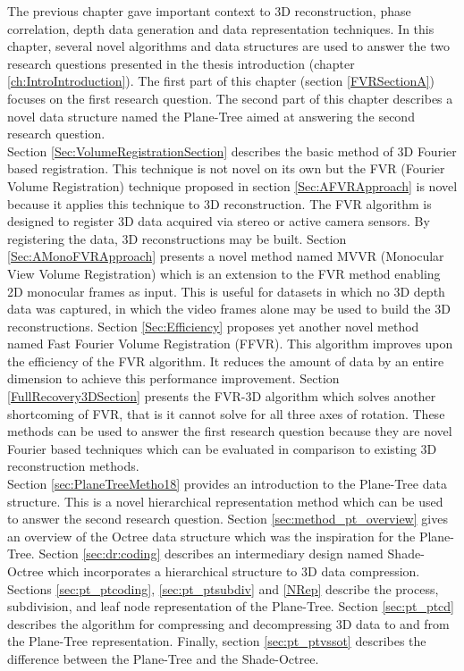 
The previous chapter gave important context to 3D reconstruction, phase correlation, depth data generation and data representation techniques. In this chapter, several novel algorithms and data structures are used to answer the two research questions presented in the thesis introduction (chapter \ref{ch:IntroIntroduction}). The first part of this chapter (section \ref{FVRSectionA}) focuses on the first research question. The second part of this chapter describes a novel data structure named the Plane-Tree aimed at answering the second research question. \\

Section \ref{Sec:VolumeRegistrationSection} describes the basic method of 3D Fourier based registration. This technique is not novel on its own but the FVR (Fourier Volume Registration) technique proposed in section \ref{Sec:AFVRApproach} is novel because it applies this technique to 3D reconstruction. The FVR algorithm is designed to register 3D data acquired via stereo or active camera sensors. By registering the data, 3D reconstructions may be built. Section \ref{Sec:AMonoFVRApproach} presents a novel method named MVVR (Monocular View Volume Registration) which is an  extension to the FVR method enabling 2D monocular frames as input. This is useful for datasets in which no 3D depth data was captured, in which the video frames alone may be used to build the 3D reconstructions. Section \ref{Sec:Efficiency} proposes yet another novel method named Fast Fourier Volume Registration (FFVR). This algorithm improves upon the efficiency of the FVR algorithm. It reduces the amount of data by an entire dimension to achieve this performance improvement. Section \ref{FullRecovery3DSection} presents the FVR-3D algorithm which solves another shortcoming of FVR, that is it cannot solve for all three axes of rotation. These methods can be used to answer the first research question because they are novel Fourier based techniques which can be evaluated in comparison to existing 3D reconstruction methods. \\

Section \ref{sec:PlaneTreeMetho18} provides an introduction to the Plane-Tree data structure. This is a novel hierarchical representation method which can be used to answer the second research question. Section \ref{sec:method_pt_overview} gives an overview of the Octree data structure which was the inspiration for the Plane-Tree. Section \ref{sec:dr:coding} describes an intermediary design named Shade-Octree which incorporates a hierarchical structure to 3D data compression. Sections \ref{sec:pt_ptcoding}, \ref{sec:pt_ptsubdiv} and \ref{NRep} describe the process, subdivision, and leaf node representation of the Plane-Tree. Section \ref{sec:pt_ptcd} describes the algorithm for compressing and decompressing 3D data to and from the Plane-Tree representation. Finally, section \ref{sec:pt_ptvssot} describes the difference between the Plane-Tree and the Shade-Octree. \\
